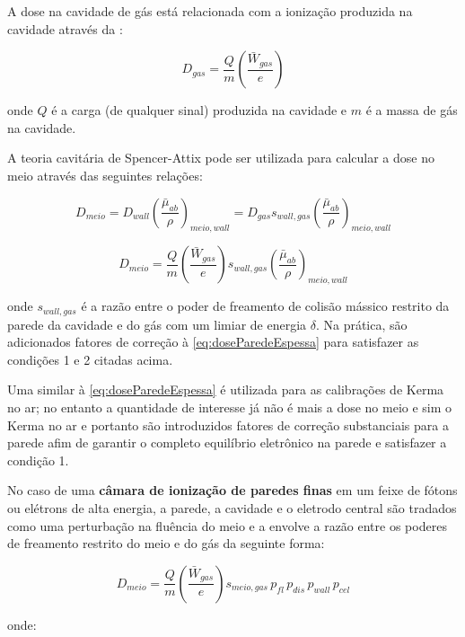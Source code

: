 \documentclass[11pt,a4paper]{article}
\begin{document}
			A dose na cavidade de gás está relacionada com a ionização produzida na cavidade através da  :

				\begin{equation}
					D_{gas} = \frac{Q}{m}\left(\frac{\bar{W}_{gas}}{e}\right)
				\end{equation}

			\noindent onde $Q$ é a carga (de qualquer sinal) produzida na cavidade e $m$ é a massa de gás na cavidade.

			A teoria cavitária de Spencer-Attix pode ser utilizada para calcular a dose no meio através das seguintes relações:

			$$D_{meio} = D_{wall} \left(\frac{\bar{\mu}_{ab}}{\rho}\right)_{meio, wall} = D_{gas} s_{wall, gas}\left(\frac{\bar{\mu}_{ab}}{\rho}\right)_{meio, wall}$$

			\begin{equation}
				D_{meio} = \frac{Q}{m}\left(\frac{\bar{W}_{gas}}{e}\right)s_{wall, gas}\left(\frac{\bar{\mu}_{ab}}{\rho}\right)_{meio, wall}
				\label{eq:doseParedeEspessa}
			\end{equation}

			\noindent onde $s_{wall, gas}$ é a razão entre o poder de freamento de colisão mássico restrito da parede da cavidade e do gás com um limiar de energia $\delta$. Na prática, são adicionados fatores de correção à   \ref{eq:doseParedeEspessa} para satisfazer as condições 1 e 2 citadas acima.

			Uma   similar à   \ref{eq:doseParedeEspessa} é utilizada para as calibrações de Kerma no ar; no entanto a quantidade de interesse já não é mais a dose no meio e sim o Kerma no ar e portanto são introduzidos fatores de correção substanciais para a parede afim de garantir o completo equilíbrio eletrônico na parede e satisfazer a condição 1.

			No caso de uma \textbf{\textcolor{CarnationPink}{câmara de ionização de paredes finas}} em um feixe de fótons ou elétrons de alta energia, a parede, a cavidade e o eletrodo central são tradados como uma perturbação na fluência do meio e a   envolve a razão entre os poderes de freamento restrito do meio e do gás da seguinte forma:

				\begin{equation}
					D_{meio} = \frac{Q}{m}\left(\frac{\bar{W}_{gas}}{e}\right)s_{meio, gas}\, p_{fl}\, p_{dis}\, p_{wall}\, p_{cel}
				\end{equation}

			\noindent onde:
\end{document}
